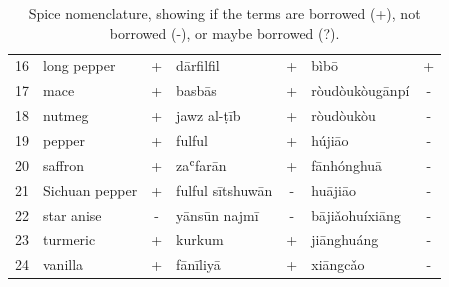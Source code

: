 \begin{table}[h]
\begin{tabular}{@{}rlclclc@{}}
    16          & long pepper      & +           & dārfilfil        & +           & bìbō             & +           \\
    17          & mace             & +           & basbās           & +           & ròudòukòugānpí   & -           \\
    18          & nutmeg           & +           & jawz al-ṭīb      & +           & ròudòukòu        & -           \\
    19          & pepper           & +           & fulful           & +           & hújiāo           & -           \\
    20          & saffron          & +           & zaʿfarān         & +           & fānhónghuā       & -           \\
    21          & Sichuan pepper   & +           & fulful sītshuwān & -           & huā​jiāo         & -           \\
    22          & star anise       & -           & yānsūn najmī     & -           & bājiǎohuíxiāng   & -           \\
    23          & turmeric         & +           & kurkum           & +           & jiānghuáng       & -           \\
    24          & vanilla          & +           & fānīliyā         & +           & xiāngcǎo         & -           \\ \bottomrule
    \end{tabular}
    \caption[Spice nomenclature, showing if the terms are borrowed or not.]{Spice nomenclature, showing if the terms are borrowed (+), not borrowed (-), or maybe borrowed (?).}
    \label{table:borrowings}
    \end{table}


